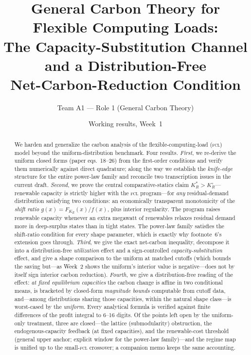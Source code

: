 \documentclass[11pt,reqno]{amsart}
\theoremstyle{plain}
\theoremstyle{definition}
\theoremstyle{remark}
\newcommand{\KR}{K_R}
\newcommand{\KRs}{K_R^{*}}
\newcommand{\KRo}{K_R^{\circ}}
\newcommand{\FKR}{F_{\!\KR}}
\begin{document}
\title[General Carbon Theory for Flexible Computing Loads]
{General Carbon Theory for Flexible Computing Loads:\\
The Capacity-Substitution Channel and a Distribution-Free\\
Net-Carbon-Reduction Condition}
\author{Team A1 --- Role 1 (General Carbon Theory)}
\date{Working results, Week~1}

\begin{abstract}
We harden and generalize the carbon analysis of the flexible-computing-load
(\textsc{fcl}) model beyond the uniform-distribution benchmark. Four results.
\emph{First}, we re-derive the uniform closed forms (paper eqs.\ 18--26) from
the first-order conditions and verify them numerically against direct
quadrature; along the way we establish the \emph{knife-edge} structure for the
entire power-law family and reconcile two transcription issues in the current
draft. \emph{Second}, we prove the central comparative-statics claim
$\KRs>\KRo$---renewable capacity is strictly higher with the \textsc{fcl}
program---for \emph{any} residual-demand distribution satisfying two conditions:
an economically transparent monotonicity of the \emph{shift ratio}
$g(x)=\FKR(x)/f(x)$, plus interior regularity. The program raises renewable
capacity whenever an extra megawatt of renewables relaxes residual demand more in
deep-surplus states than in tight states. The power-law family satisfies the
shift-ratio condition for every shape parameter, which is exactly why footnote~6's
extension goes through. \emph{Third}, we give the exact net-carbon inequality,
decompose it into a distribution-free \emph{utilization} effect and a
sign-controlled \emph{capacity-substitution} effect, and give a shape comparison to the
uniform at matched cutoffs (which bounds the saving but---as Week~2 shows the uniform's
interior value is negative---does not by itself sign interior carbon reduction).
\emph{Fourth}, we give a
distribution-free reading of the effect: \emph{at fixed equilibrium capacities} the
carbon change is affine in two conditional means, is bracketed by closed-form
\emph{magnitude bounds} computable from cutoff data, and---among distributions
sharing those capacities, within the natural shape class---is worst-cased by the
\emph{uniform}. Every analytical formula is verified against finite
differences of the profit integral to 6--16 digits. Of the points left open by the
uniform-only treatment, three are closed---the lattice (submodularity)
obstruction, the endogenous-capacity feedback (at fixed capacities), and the
renewable-cost threshold (general upper anchor; explicit window for the power-law
family)---and the regime map is unified up to the small-\textsc{fcl} crossover; a
companion memo keeps the same accounting.
\end{abstract}
\end{document}
